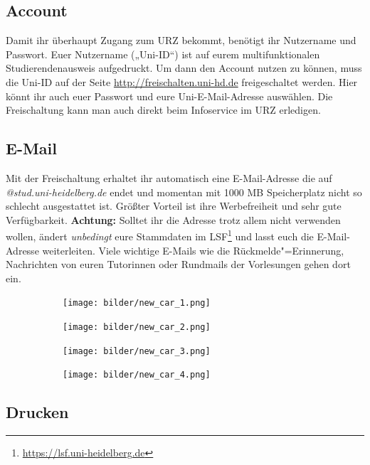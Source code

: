 \subsection{Account}
Damit ihr überhaupt Zugang zum URZ bekommt, benötigt ihr Nutzername und Passwort. Euer Nutzername („Uni-ID“) ist auf eurem multifunktionalen Studierendenausweis aufgedruckt. Um dann den Account nutzen zu können, muss die Uni-ID auf der Seite \url{http://freischalten.uni-hd.de} freigeschaltet werden. Hier könnt ihr auch euer Passwort und eure Uni-E-Mail-Adresse auswählen. Die Freischaltung kann man auch direkt beim Infoservice im URZ erledigen.

\subsection{E-Mail}
Mit der Freischaltung erhaltet ihr automatisch eine E-Mail-Adresse die auf \emph{@stud.uni-heidelberg.de} endet und momentan mit 1000 MB Speicherplatz nicht so schlecht ausgestattet ist. Größter Vorteil ist ihre Werbefreiheit und sehr gute Verfügbarkeit. \textbf{Achtung:} Solltet ihr die Adresse trotz allem nicht verwenden wollen, ändert \emph{unbedingt} eure Stammdaten im LSF\footnote{\url{https://lsf.uni-heidelberg.de}} und lasst euch die E-Mail-Adresse weiterleiten. Viele wichtige E-Mails wie die Rückmelde"=Erinnerung, Nachrichten von euren Tutorinnen oder Rundmails der Vorlesungen gehen dort ein.

\begin{figure}[b]
    \centering
    \begin{subfigure}{.2\textwidth}
	    \texttt{[image: bilder/new\_car\_1.png]}
    \end{subfigure}
    \begin{subfigure}{.2\textwidth}
        \texttt{[image: bilder/new\_car\_2.png]}
    \end{subfigure}
    \begin{subfigure}{.2\textwidth}
        \texttt{[image: bilder/new\_car\_3.png]}
    \end{subfigure}
    \begin{subfigure}{.2\textwidth}
        \texttt{[image: bilder/new\_car\_4.png]}
    \end{subfigure}
\end{figure}

\subsection{Drucken}

